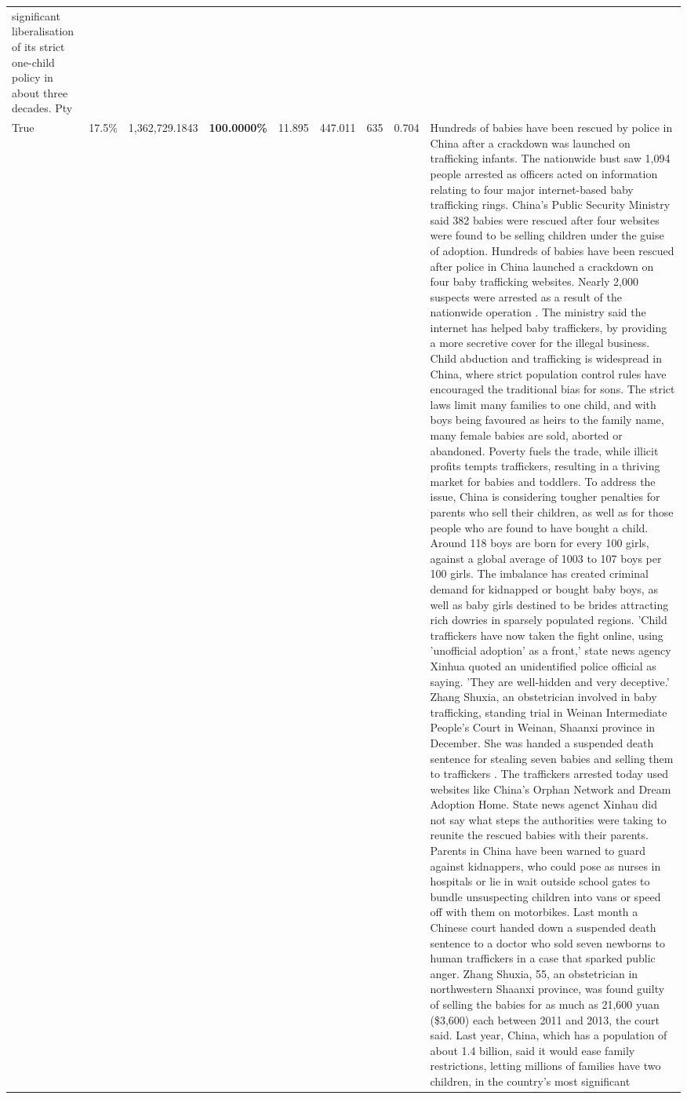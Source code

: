 \begin{table}[H]
\begin{tabular}{lllrlllll}
significant liberalisation of its strict one-child policy in about three decades. Pty \\
\cline{1-9}
True & 17.5\% & 1,362,729.1843 & \bfseries \color{red} 100.0000\% & 11.895 & 447.011 & 635 & 0.704 & Hundreds of babies have been rescued by police in China after a crackdown was launched on trafficking infants. The nationwide bust saw 1,094 people arrested as officers acted on information relating to four major internet-based baby trafficking rings. China's Public Security Ministry said 382 babies were rescued after four websites were found to be selling children under the guise of adoption. Hundreds of babies have been rescued after police in China launched a crackdown on four baby trafficking websites. Nearly 2,000 suspects were arrested as a result of the nationwide operation . The ministry said the internet has helped baby traffickers, by providing a more secretive cover for the illegal business. Child abduction and trafficking is widespread in China, where strict population control rules have encouraged the traditional bias for sons. The strict laws limit many families to one child, and with boys being favoured as heirs to the family name, many female babies are sold, aborted or abandoned. Poverty fuels the trade, while illicit profits tempts traffickers, resulting in a thriving market for babies and toddlers. To address the issue, China is considering tougher penalties for parents who sell their children, as well as for those people who are found to have bought a child. Around 118 boys are born for every 100 girls, against a global average of 1003 to 107 boys per 100 girls. The imbalance has created criminal demand for kidnapped or bought baby boys, as well as baby girls destined to be brides attracting rich dowries in sparsely populated regions. 'Child traffickers have now taken the fight online, using 'unofficial adoption' as a front,' state news agency Xinhua quoted an unidentified police official as saying. 'They are well-hidden and very deceptive.' Zhang Shuxia, an obstetrician involved in baby trafficking, standing trial in Weinan Intermediate People's Court in Weinan, Shaanxi province in December. She was handed a suspended death sentence for stealing seven babies and selling them to traffickers . The traffickers arrested today used websites like China's Orphan Network and Dream Adoption Home. State news agenct Xinhau did not say what steps the authorities were taking to reunite the rescued babies with their parents. Parents in China have been warned to guard against kidnappers, who could pose as nurses in hospitals or lie in wait outside school gates to bundle unsuspecting children into vans or speed off with them on motorbikes. Last month a Chinese court handed down a suspended death sentence to a doctor who sold seven newborns to human traffickers in a case that sparked public anger. Zhang Shuxia, 55, an obstetrician in northwestern Shaanxi province, was found guilty of selling the babies for as much as 21,600 yuan (\$3,600) each between 2011 and 2013, the court said. Last year, China, which has a population of about 1.4 billion, said it would ease family restrictions, letting millions of families have two children, in the country's most significant 
\end{tabular}
\end{table}
